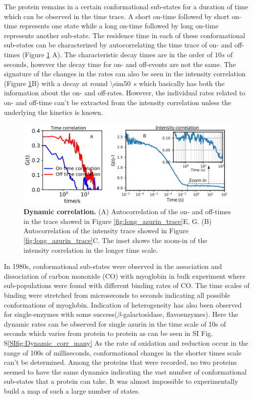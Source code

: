 The protein remains in a certain conformational sub-states for a duration of time which can be observed in the time trace.
A short on-time followed by short on-time represents one state while a long on-time followed by long on-time represents another sub-state.
The residence time in each of these conformational sub-states can be characterized by autocorrelating the time trace of on- and off-times (Figure \ref{fig:Dynamic_corr} A).
The characteristic decay times are in the order of $10s$ of seconds, however the decay time for on- and off-events are not the same.
The signature of the changes in the rates can also be seen in the intensity correlation (Figure \ref{fig:Dynamic_corr}B) with a decay at round \SI{\sim50}{\s} which basically has both the information about the on- and off-rates.
However, the individual rates related to on- and off-time can't be extracted from the intensity correlation unless the underlying the kinetics is known.
\begin{figure}
	\centering
	\includegraphics[width=\textwidth]{Dynamic_corr}
	\caption{\textbf{Dynamic correlation.} (A) Autocorrelation of the on- and off-times in the trace showed in Figure \ref{fig:long_azurin_trace}E, G. (B) Autocorrelation of the intensity trace showed in Figure \ref{fig:long_azurin_trace}C. The inset shows the zoom-in of the intensity correlation in the longer time scale.}
	\label{fig:Dynamic_corr}
\end{figure}

In 1980s, conformational sub-states were observed in the association and dissociation of carbon monoxide (CO) with myoglobin in bulk experiment where sub-populations were found with different binding rates of CO.
The time scales of binding were stretched from microseconds to seconds indicating all possible conformations of myoglobin.
Indication of heterogeneity has also been observed for single-enzymes with some success($\beta$-galactosidase, flavoenzymes)\cite{lu1998single-molecule,kou2005single-molecule,english2006ever-fluctuating}.
Here the dynamic rates can be observed for single azurin in the time scale of 10s of seconds which varies from protein to protein as can be seen in SI Fig. S\ref{SIfig:Dynamic_corr_many}
As the rate of oxidation and reduction occur in the range of 100s of milliseconds, conformational changes in the shorter times scale can't be determined.
Among the proteins that were recorded, no two proteins seemed to have the same dynamics indicating the vast number of conformational sub-states that a protein can take.
It was almost impossible to experimentally build a map of such a large number of states.

